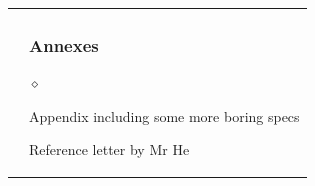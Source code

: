 \documentclass[a4paper]{article}
\newlength{\sectsep}
\newlength{\subsectsep}
\renewenvironment{itemize}{
  \begin{list}{$\diamond$}{
    \setlength{\topsep}{0.25em}
    \setlength{\itemsep}{0em}
    \setlength{\parskip}{0pt}
    \setlength{\parsep}{0em}
  }
}{
  \end{list}
}
\begin{document}
\begin{longtable}{r || l}
  & \begin{minipage}{0.9\textwidth}
      \vspace{\subsectsep}
      \subsubsection*{Annexes}
      \begin{itemize}
          \item Appendix including some more boring specs
          \item Reference letter by Mr He
      \end{itemize}
      \vfill
    \end{minipage} \\

  \end{longtable}
\end{document}
